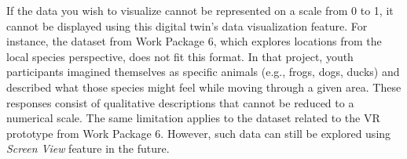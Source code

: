 \begin{itemize}
    If the data you wish to visualize cannot be represented on a scale from 0 to 1, it cannot be displayed using this digital twin's data visualization feature. For instance, the dataset from Work Package 6, which explores locations from the local species perspective, does not fit this format. In that project, youth participants imagined themselves as specific animals (e.g., frogs, dogs, ducks) and described what those species might feel while moving through a given area. These responses consist of qualitative descriptions that cannot be reduced to a numerical scale. The same limitation applies to the dataset related to the VR prototype from Work Package 6. However, such data can still be explored using \textit{Screen View} feature in the future.

\end{itemize}

